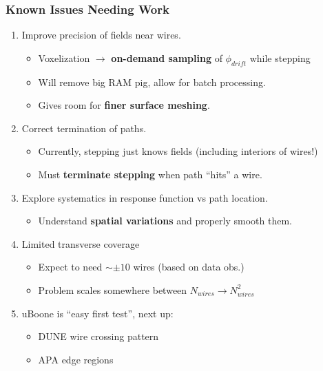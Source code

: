 \documentclass[xcolor=dvipsnames]{beamer}
\begin{document}
\begin{frame}
  \frametitle{Known Issues Needing Work}
  \begin{enumerate}
  \item Improve precision of fields near wires.
    \begin{itemize}\footnotesize
    \item Voxelization $\to$ \textbf{on-demand sampling} of $\phi_{drift}$ while stepping
    \item Will remove big RAM pig, allow for batch processing.
    \item Gives room for \textbf{finer surface meshing}.
    \end{itemize}
  \item Correct termination of paths.
    \begin{itemize}\footnotesize
    \item Currently, stepping just knows fields (including interiors of wires!)
    \item Must \textbf{terminate stepping} when path ``hits'' a wire.
    \end{itemize}
  \item Explore systematics in response function vs path location.
    \begin{itemize}\footnotesize
    \item Understand \textbf{spatial variations} and properly smooth them.
    \end{itemize}
  \item Limited transverse coverage
    \begin{itemize}\footnotesize
    \item Expect to need $\sim \pm 10$ wires (based on data obs.)
    \item Problem scales somewhere between $N_{wires} \to N^2_{wires}$
    \end{itemize}
  \item uBoone is ``easy first test'', next up:
    \begin{itemize}\footnotesize
    \item DUNE wire crossing pattern
    \item APA edge regions
    \end{itemize}
  \end{enumerate}
\end{frame}
\end{document}
